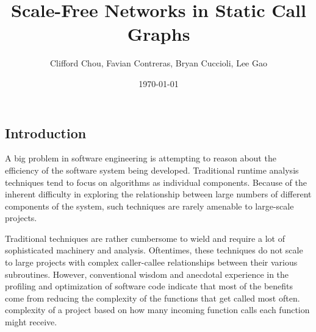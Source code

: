 \documentclass[11pt,a4paper,twocolumn]{article}
\author{Clifford Chou, Favian Contreras, Bryan Cuccioli, Lee Gao}
\title{Scale-Free Networks in Static Call Graphs}
\date{\today}
\begin{document}
\begin{singlespace}


\section{Introduction}

A big problem in software engineering is attempting to reason about
the efficiency of the software system being developed. Traditional runtime
analysis techniques tend to focus on algorithms as individual components.
Because of the inherent difficulty in exploring the relationship between
large numbers of different components of the system, such techniques are
rarely amenable to large-scale projects.

Traditional techniques are rather cumbersome to wield and require a lot of
sophisticated machinery and analysis. 
Oftentimes, these techniques do not scale to large
projects with complex caller-callee relationships between their various subroutines. 
However, conventional wisdom and anecdotal experience in the profiling and 
optimization of software code indicate
that most of the benefits come from reducing the complexity of
the functions that get called most often. %
complexity of a project based on how many incoming function calls each
function might receive.


\end{singlespace}
\end{document}
